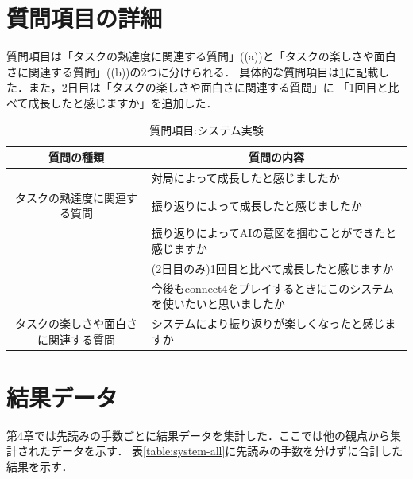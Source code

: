 \section{質問項目の詳細}
質問項目は「タスクの熟達度に関連する質問」((a))と「タスクの楽しさや面白さに関連する質問」((b))の2つに分けられる．
具体的な質問項目は\ref{table:query}に記載した．また，2日目は「タスクの楽しさや面白さに関連する質問」に
「1回目と比べて成長したと感じますか」を追加した．
\begin{table}[H]
    \caption{質問項目:システム実験}
    \label{table:query}
    \centering
	\scriptsize
    \begin{tabular}{c||l}
        \multicolumn{1}{c|}{質問の種類} & \multicolumn{1}{c}{質問の内容} \\ \hline \hline
        \multicolumn{1}{c||}{}&対局によって成長したと感じましたか \\
        タスクの熟達度に関連する質問 & 振り返りによって成長したと感じましたか \\
		\multicolumn{1}{c||}{}&振り返りによってAIの意図を掴むことができたと感じますか \\
		\multicolumn{1}{c||}{} & (2日目のみ)1回目と比べて成長したと感じますか\\\hline
        \multicolumn{1}{c||}{} & 今後もconnect4をプレイするときにこのシステムを使いたいと思いましたか \\
        タスクの楽しさや面白さに関連する質問 & システムにより振り返りが楽しくなったと感じますか\\
    \end{tabular}
    
\end{table}
\section{結果データ}
第4章では先読みの手数ごとに結果データを集計した．ここでは他の観点から集計されたデータを示す．
表\ref{table:system-all}に先読みの手数を分けずに合計した結果を示す．
\begin{table}[H]
    \caption{結果:総合}
    \label{table:system-all}
    \scriptsize
    \centering
    
\end{table}


